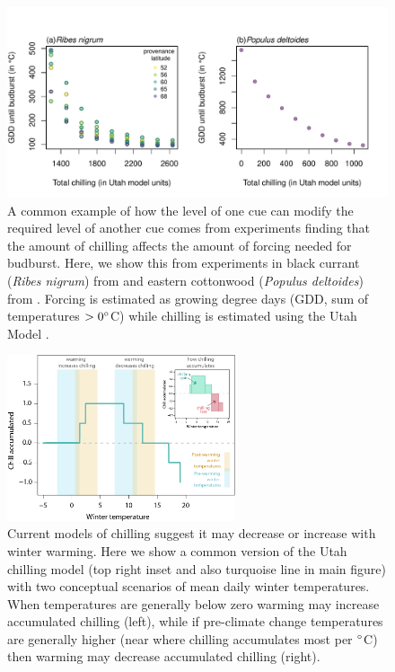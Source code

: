 \documentclass[11pt,letter]{article}
\begin{document}
\clearpage
\begin{figure}
\centering
\includegraphics[width=1\textwidth]{..//..//analyses/limitingcues/figures/gddbyutahpretty.pdf}
\caption{A common example of how the level of one cue can modify the required level of another cue comes from experiments finding that the amount of chilling affects the amount of forcing needed for budburst. Here, we show this from experiments in black currant (\emph{Ribes nigrum}) from \citet{Sonsteby:2014aa} and eastern cottonwood (\emph{Populus deltoides}) from \citet{Thielges:1976aa}. Forcing is estimated as growing degree days (GDD, sum of temperatures $>0\degree$C) while chilling is estimated using the Utah Model \citep[see][]{richardson1974}.} %
  \label{fig:gddbyutah} 
\end{figure}

\clearpage
\begin{figure}[t!]
\centering
\includegraphics[width=0.6\textwidth]{figures/utahchill_limiting.png}
\caption{Current models of chilling suggest it may decrease or increase with winter warming. Here we show a common version of the Utah chilling model (top right inset and also turquoise line in main figure) with two conceptual scenarios of mean daily winter temperatures. When temperatures are generally below zero warming may increase accumulated chilling (left), while if pre-climate change temperatures are generally higher (near where chilling accumulates most per $\degree$C) then warming may decrease accumulated chilling (right).}
  \label{fig:chilling}
\end{figure}
\end{document}
